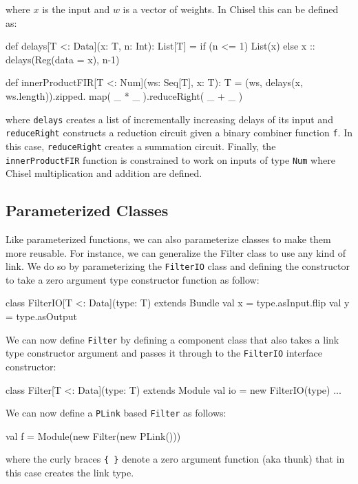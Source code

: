 \documentclass[twocolumn,10pt]{article}
\def\code#1{{\tt #1}}
\begin{document}
\noindent 
where $x$ is the input and $w$ is a vector of weights.
In Chisel this can be defined as:

\begin{scala}
def delays[T <: Data](x: T, n: Int): List[T] = 
  if (n <= 1) List(x) else x :: delays(Reg(data = x), n-1)

def innerProductFIR[T <: Num](ws: Seq[T], x: T): T = 
  (ws, delays(x, ws.length)).zipped.
    map( _ * _ ).reduceRight( _ + _ )
\end{scala}
 
\noindent
where 
\code{delays} creates a list of incrementally increasing delays of its input and
\code{reduceRight} constructs a reduction circuit given a binary combiner function \code{f}.  
In this case, \code{reduceRight} creates a summation circuit.
Finally, the \code{innerProductFIR} function is constrained to work on inputs of type \code{Num} where Chisel multiplication and addition are defined.

\subsection{Parameterized Classes}

Like parameterized functions, we can also parameterize classes to make them more reusable.
For instance, we can generalize the Filter class to use any kind of link.  
We do so by parameterizing the \verb+FilterIO+ class and defining the constructor to take a zero argument type constructor function as follow:

\begin{scala}
class FilterIO[T <: Data](type: T) extends Bundle { 
  val x = type.asInput.flip
  val y = type.asOutput
}
\end{scala}

\noindent
We can now define \verb+Filter+ by defining a component class that also takes a link type constructor argument and passes it through to the \verb+FilterIO+ interface constructor:

\begin{scala}
class Filter[T <: Data](type: T) extends Module { 
  val io = new FilterIO(type)
  ...
}
\end{scala}

\noindent
We can now define a \verb+PLink+ based \verb+Filter+ as follows:
\begin{scala}
val f = Module(new Filter(new PLink()))
\end{scala}

\noindent
where the curly braces \verb+{ }+ denote a zero argument function (aka thunk) that in this case creates the link type.
\end{document}
